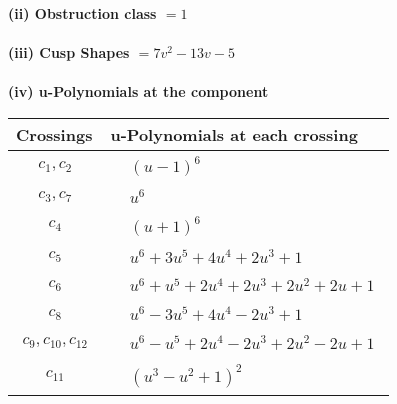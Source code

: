\documentclass[1p]{elsarticle_modified}
\theoremstyle{definition}
\begin{document}
\flushleft \textbf{(ii) Obstruction class $= 1$}\\~\\
\flushleft \textbf{(iii) Cusp Shapes $= 7 v^2-13 v-5$}\\~\\
\newpage\renewcommand{\arraystretch}{1}
\flushleft \textbf{(iv) u-Polynomials at the component}\newline \\
\begin{tabular}{m{50pt}|m{274pt}}
Crossings & \hspace{64pt}u-Polynomials at each crossing \\
\hline $$\begin{aligned}c_{1},c_{2}\end{aligned}$$&$\begin{aligned}
&(u-1)^6
\end{aligned}$\\
\hline $$\begin{aligned}c_{3},c_{7}\end{aligned}$$&$\begin{aligned}
&u^6
\end{aligned}$\\
\hline $$\begin{aligned}c_{4}\end{aligned}$$&$\begin{aligned}
&(u+1)^6
\end{aligned}$\\
\hline $$\begin{aligned}c_{5}\end{aligned}$$&$\begin{aligned}
&u^6+3 u^5+4 u^4+2 u^3+1
\end{aligned}$\\
\hline $$\begin{aligned}c_{6}\end{aligned}$$&$\begin{aligned}
&u^6+u^5+2 u^4+2 u^3+2 u^2+2 u+1
\end{aligned}$\\
\hline $$\begin{aligned}c_{8}\end{aligned}$$&$\begin{aligned}
&u^6-3 u^5+4 u^4-2 u^3+1
\end{aligned}$\\
\hline $$\begin{aligned}c_{9},c_{10},c_{12}\end{aligned}$$&$\begin{aligned}
&u^6- u^5+2 u^4-2 u^3+2 u^2-2 u+1
\end{aligned}$\\
\hline $$\begin{aligned}c_{11}\end{aligned}$$&$\begin{aligned}
&(u^3- u^2+1)^2
\end{aligned}$\\
\hline
\end{tabular}\\~\\
\end{document}
